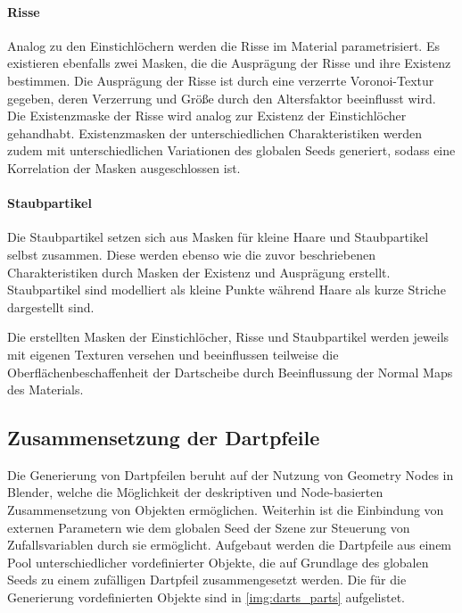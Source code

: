 \paragraph{Risse}

Analog zu den Einstichlöchern werden die Risse im Material parametrisiert. Es existieren ebenfalls zwei Masken, die die Ausprägung der Risse und ihre Existenz bestimmen. Die Ausprägung der Risse ist durch eine verzerrte Voronoi-Textur gegeben, deren Verzerrung und Größe durch den Altersfaktor beeinflusst wird. Die Existenzmaske der Risse wird analog zur Existenz der Einstichlöcher gehandhabt. Existenzmasken der unterschiedlichen Charakteristiken werden zudem mit unterschiedlichen Variationen des globalen Seeds generiert, sodass eine Korrelation der Masken ausgeschlossen ist.

\paragraph{Staubpartikel}

Die Staubpartikel setzen sich aus Masken für kleine Haare und Staubpartikel selbst zusammen. Diese werden ebenso wie die zuvor beschriebenen Charakteristiken durch Masken der Existenz und Ausprägung erstellt. Staubpartikel sind modelliert als kleine Punkte während Haare als kurze Striche dargestellt sind.

\vspace{\baselineskip}

\noindent Die erstellten Masken der Einstichlöcher, Risse und Staubpartikel werden jeweils mit eigenen Texturen versehen und beeinflussen teilweise die Oberflächenbeschaffenheit der Dartscheibe durch Beeinflussung der Normal Maps des Materials.

\subsection{Zusammensetzung der Dartpfeile}  %
\label{sec:dartpfeile_zusammensetzung}

Die Generierung von Dartpfeilen beruht auf der Nutzung von Geometry Nodes in Blender, welche die Möglichkeit der deskriptiven und Node-basierten Zusammensetzung von Objekten ermöglichen. Weiterhin ist die Einbindung von externen Parametern wie dem globalen Seed der Szene zur Steuerung von Zufallsvariablen durch sie ermöglicht. Aufgebaut werden die Dartpfeile aus einem Pool unterschiedlicher vordefinierter Objekte, die auf Grundlage des globalen Seeds zu einem zufälligen Dartpfeil zusammengesetzt werden. Die für die Generierung vordefinierten Objekte sind in \autoref{img:darts_parts} aufgelistet.

